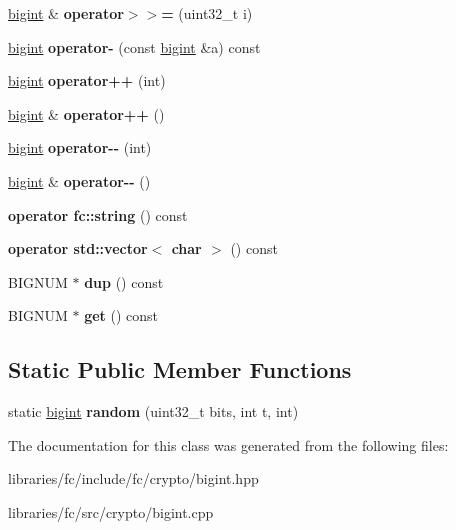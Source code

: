 \begin{DoxyCompactItemize}
\mbox{\label{classfc_1_1bigint_abe6fa0986e47e98753b42924ad157a57}} 
\mbox{\hyperlink{classfc_1_1bigint}{bigint}} \& {\bfseries operator$>$$>$=} (uint32\+\_\+t i)
\item 
\mbox{\label{classfc_1_1bigint_acf0167324b72a936b3777f5f4efcf15a}} 
\mbox{\hyperlink{classfc_1_1bigint}{bigint}} {\bfseries operator-\/} (const \mbox{\hyperlink{classfc_1_1bigint}{bigint}} \&a) const
\item 
\mbox{\label{classfc_1_1bigint_aeeed63218ddee1945d2903ec8de127df}} 
\mbox{\hyperlink{classfc_1_1bigint}{bigint}} {\bfseries operator++} (int)
\item 
\mbox{\label{classfc_1_1bigint_ad9bdb01f12f428d0e5addfa59c295962}} 
\mbox{\hyperlink{classfc_1_1bigint}{bigint}} \& {\bfseries operator++} ()
\item 
\mbox{\label{classfc_1_1bigint_a3832b6df4103eff5b58ba388a0b2c6b3}} 
\mbox{\hyperlink{classfc_1_1bigint}{bigint}} {\bfseries operator-\/-\/} (int)
\item 
\mbox{\label{classfc_1_1bigint_a14299996f33c1f7abb645a1d0b20f8fd}} 
\mbox{\hyperlink{classfc_1_1bigint}{bigint}} \& {\bfseries operator-\/-\/} ()
\item 
\mbox{\label{classfc_1_1bigint_a084ca00b3c29ec193133f4e676b43a63}} 
{\bfseries operator fc\+::string} () const
\item 
\mbox{\label{classfc_1_1bigint_a8c10185176c6dfb4a10f16a760b79d72}} 
{\bfseries operator std\+::vector$<$ char $>$} () const
\item 
\mbox{\label{classfc_1_1bigint_a4b2255410ddb1e3061f090746048c798}} 
B\+I\+G\+N\+UM $\ast$ {\bfseries dup} () const
\item 
\mbox{\label{classfc_1_1bigint_ae69989f6110d91a3ee3433c7f50aef12}} 
B\+I\+G\+N\+UM $\ast$ {\bfseries get} () const
\end{DoxyCompactItemize}
\subsection*{Static Public Member Functions}
\begin{DoxyCompactItemize}
\item 
\mbox{\label{classfc_1_1bigint_a5c1dd3c77d67ffc96ed46717f1a25d54}} 
static \mbox{\hyperlink{classfc_1_1bigint}{bigint}} {\bfseries random} (uint32\+\_\+t bits, int t, int)
\end{DoxyCompactItemize}


The documentation for this class was generated from the following files\+:\begin{DoxyCompactItemize}
\item 
libraries/fc/include/fc/crypto/bigint.\+hpp\item 
libraries/fc/src/crypto/bigint.\+cpp\end{DoxyCompactItemize}
